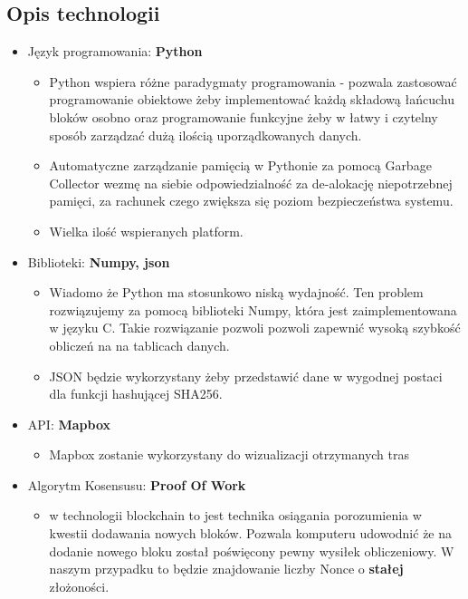 \documentclass{sprawozdanie-agh}
\begin{document}
\subsection{Opis technologii}
\begin{itemize}
    \item Język programowania: \textbf{Python}\\
    \begin{itemize}
    \item Python wspiera różne paradygmaty programowania - pozwala zastosować programowanie obiektowe żeby
    implementować każdą składową łańcuchu bloków osobno oraz programowanie funkcyjne żeby w łatwy i czytelny sposób
    zarządzać dużą ilością uporządkowanych danych.
    \item Automatyczne zarządzanie pamięcią w Pythonie za pomocą Garbage Collector wezmę na siebie odpowiedzialność za de-alokację niepotrzebnej pamięci, za rachunek czego zwiększa się poziom bezpieczeństwa systemu.
    \item Wielka ilość wspieranych platform.
    \end{itemize}

    \item Biblioteki: \textbf{Numpy, json}
    \begin{itemize}
    \item Wiadomo że Python ma stosunkowo niską wydajność. Ten problem rozwiązujemy za pomocą biblioteki Numpy,
    która jest zaimplementowana w języku C. Takie rozwiązanie pozwoli pozwoli zapewnić wysoką szybkość obliczeń na
    na tablicach danych.
    \item JSON będzie wykorzystany żeby przedstawić dane w wygodnej postaci dla funkcji hashującej SHA256.
    \end{itemize}
    
    \item API: \textbf{Mapbox}
        \begin{itemize}
            \item Mapbox zostanie wykorzystany do wizualizacji otrzymanych tras
        \end{itemize}
        
    \item Algorytm Kosensusu: \textbf{Proof Of Work} 
    \begin{itemize}
            \item w technologii blockchain to jest technika osiągania porozumienia w kwestii dodawania nowych bloków.
            Pozwala komputeru udowodnić że na dodanie nowego bloku został poświęcony pewny wysiłek obliczeniowy. W naszym przypadku to będzie znajdowanie liczby Nonce o \textbf{stałej} złożoności.
    \end{itemize}
    
\end{itemize}
\end{document}
